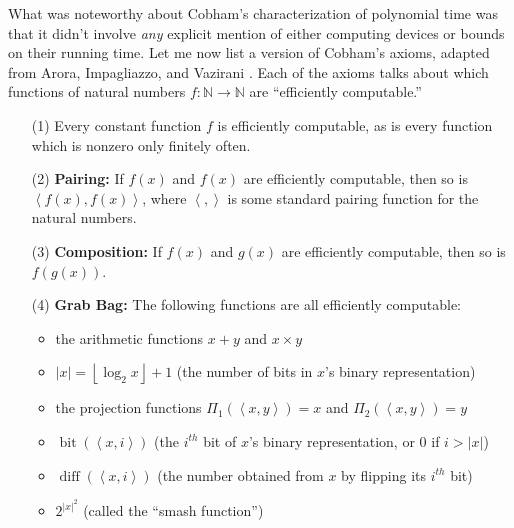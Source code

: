 \documentclass[12pt,onecolumn]{article}%
\begin{document}
What was noteworthy about Cobham's characterization of polynomial time was
that it didn't involve \textit{any} explicit mention of either computing
devices or bounds on their running time. Let me now list a version of
Cobham's axioms, adapted from Arora, Impagliazzo, and Vazirani \cite{aiv}.
 Each of the axioms talks about which functions of natural numbers
$f:\mathbb{N}\rightarrow\mathbb{N}$ are \textquotedblleft efficiently
computable.\textquotedblright\ 

\begin{enumerate}
\item[(1)] Every constant function $f$ is efficiently computable, as is every
function which is nonzero only finitely often.

\item[(2)] \textbf{Pairing:} If $f(x)  $ and $f(x)
$ are efficiently computable, then so is $\left\langle f(x)
,f(x)  \right\rangle $, where $\left\langle ,\right\rangle $ is
some standard pairing function for the natural numbers.

\item[(3)] \textbf{Composition:} If $f(x)  $ and $g(x)  $ are efficiently computable, then so is $f(g(x))  $.

\item[(4)] \textbf{Grab Bag:} The following functions are all efficiently computable:

\begin{itemize}
\item the arithmetic functions $x+y$ and $x\times y$

\item $\left\vert x\right\vert =\left\lfloor \log_{2}x\right\rfloor +1$ (the
number of bits in $x$'s binary representation)

\item the projection functions $\Pi_{1}\left(  \left\langle x,y\right\rangle
\right)  =x$ and $\Pi_{2}\left(  \left\langle x,y\right\rangle \right)  =y$

\item $\operatorname*{bit}\left(  \left\langle x,i\right\rangle \right)
$ (the $i^{th}$ bit of $x$'s binary representation, or $0$ if $i>\left\vert
x\right\vert $)

\item $\operatorname*{diff}\left(  \left\langle x,i\right\rangle \right)  $
(the number obtained from $x$ by flipping its $i^{th}$ bit)

\item $2^{\left\vert x\right\vert ^{2}}$ (called the \textquotedblleft smash
function\textquotedblright )
\end{itemize}


\end{enumerate}
\end{document}

